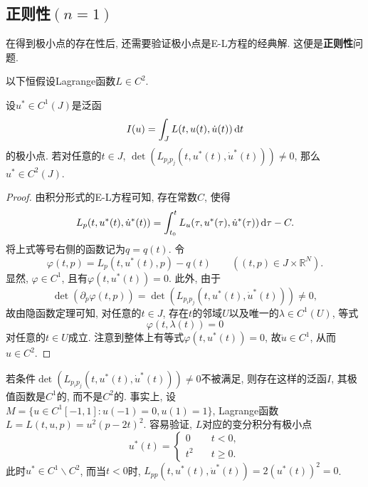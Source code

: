 \subsection{正则性\texorpdfstring{$(n = 1)$}{}}

在得到极小点的存在性后, 还需要验证极小点是E-L方程的经典解. 这便是\textbf{正则性}问题.

以下恒假设Lagrange函数$L \in C^2$.

\begin{proposition}
    设$u^* \in C^1(J)$是泛函 
    \begin{equation*}
        I(u) = \int_JL(t, u(t), \dot u(t)) \,{\rm d}t
    \end{equation*}
    的极小点. 若对任意的$t \in J$, $\det(L_{p_ip_j}(t, u^*(t), \dot u^*(t))) \neq 0$, 那么$u^* \in C^2(J)$.
    \begin{proof}
        由积分形式的E-L方程可知, 存在常数$C$, 使得 
        \begin{equation*}
            L_p(t, u^*(t), \dot u^*(t)) = \int_{t_0}^tL_u(\tau, u^*(\tau), \dot u^*(\tau)) \,{\rm d}\tau - C.
        \end{equation*} 
        将上式等号右侧的函数记为$q = q(t)$. 令
        \begin{equation*}
            \varphi(t, p) = L_p(t, u^*(t), p) - q(t) \qquad ((t, p) \in J \times \mathbb{R}^N).
        \end{equation*}
        显然, $\varphi \in C^1$, 且有$\varphi(t, u^*(t)) = 0$. 此外, 由于
        \begin{equation*}
            \det(\partial_p\varphi(t, p)) = \det(L_{p_ip_j}(t, u^*(t), \dot u^*(t))) \neq 0,
        \end{equation*} 
        故由隐函数定理可知, 对任意的$t \in J$, 存在$t$的邻域$U$以及唯一的$\lambda \in C^1(U)$, 等式 
        \begin{equation*}
            \varphi(t, \lambda(t)) = 0
        \end{equation*}
        对任意的$t \in U$成立. 注意到整体上有等式$\varphi(t, u^*(t)) = 0$, 故$\dot u \in C^1$, 从而$u \in C^2$. 
    \end{proof}
\end{proposition}

\begin{example}
    若条件$\det(L_{p_ip_j}(t, u^*(t), \dot u^*(t))) \neq 0$不被满足, 则存在这样的泛函$I$, 其极值函数是$C^1$的, 而不是$C^2$的.
    事实上, 设$M = \{u \in C^1[-1, 1]\colon u(-1) = 0, u(1) = 1\}$, Lagrange函数$L = L(t, u, p) = u^2(p - 2t)^2$.
    容易验证, $L$对应的变分积分有极小点 
    \begin{equation*}
        u^*(t) = 
        \begin{cases}
            0 \quad &t < 0, \\ 
            t^2 \quad &t \geq 0.
        \end{cases}
    \end{equation*}
    此时$u^* \in C^1 \smallsetminus C^2$, 而当$t < 0$时, $L_{pp}(t, u^*(t), \dot u^*(t)) = 2(u^*(t))^2 = 0$.
\end{example}

